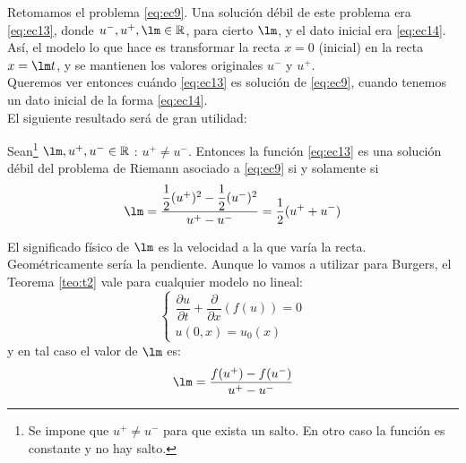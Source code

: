 Retomamos el problema \eqref{eq:ec9}. Una solución débil de este problema era \eqref{eq:ec13}, donde $u^{-}, u^{+}, \lm \in \R$, para cierto $\lm$, y el dato inicial era \eqref{eq:ec14}.
Así, el modelo lo que hace es transformar la recta $x=0$ (inicial) en la recta $x = \lm t$, y se mantienen los valores 
originales $u^{-}$ y $u^{+}$. \\

Queremos ver entonces cuándo \eqref{eq:ec13} es solución de \eqref{eq:ec9}, cuando tenemos un dato inicial de la forma \eqref{eq:ec14}. \\

El siguiente resultado será de gran utilidad:

\begin{teo}\label{teo:t2}
    Sean\footnote{Se impone que $u^{+} \neq u^{-}$ para que exista un salto. En otro caso la función es constante y no hay salto.} $\lm, u^{+}, u^{-} \in \R$ : $u^{+} \neq u^{-}$. Entonces la función \eqref{eq:ec13} es una solución débil del problema de Riemann asociado a \eqref{eq:ec9}
    si y solamente si $$\lm = \dfrac{\dfrac{1}{2}(u^{+})^2 - \dfrac{1}{2}(u^{-})^2}{u^{+} - u^{-}} = \dfrac{1}{2}(u^{+} + u^{-})$$ 
\end{teo}

\begin{observacion}
    El significado físico de $\lm$ es la velocidad a la que varía la recta. Geométricamente sería la pendiente. Aunque lo vamos a utilizar para 
    Burgers, el Teorema \ref{teo:t2} vale para cualquier modelo no lineal:
    \begin{equation}
        \begin{cases}
            \dfrac{\partial u}{\partial t} + \dfrac{\partial}{\partial x}(f(u)) = 0 \\
            u(0,x) = u_0(x)
        \end{cases}
    \end{equation}
    y en tal caso el valor de $\lm$ es:
    $$\lm = \dfrac{f(u^{+}) - f(u^{-})}{u^{+} - u^{-}}$$
\end{observacion}

